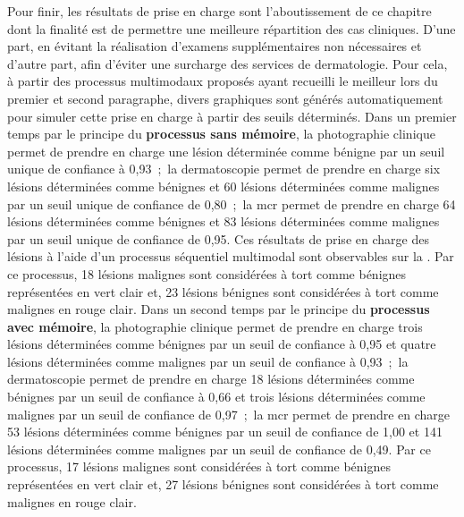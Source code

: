 Pour finir, les résultats de prise en charge sont l'aboutissement de ce chapitre dont la finalité est de permettre une meilleure répartition des cas cliniques. D'une part, en évitant la réalisation d'examens supplémentaires non nécessaires et d'autre part, afin d'éviter une surcharge des services de dermatologie. Pour cela, à partir des processus multimodaux proposés ayant recueilli le meilleur \fscore{} lors du premier et second paragraphe, divers graphiques sont générés automatiquement pour simuler cette prise en charge à partir des seuils déterminés. Dans un premier temps par le principe du \textbf{processus sans mémoire}, la photographie clinique permet de prendre en charge une lésion déterminée comme bénigne par un seuil unique de confiance à 0,93~;~la dermatoscopie permet de prendre en charge six lésions déterminées comme bénignes et 60 lésions déterminées comme malignes par un seuil unique de confiance de 0,80~;~la \gls{mcr} permet de prendre en charge 64 lésions déterminées comme bénignes et 83 lésions déterminées comme malignes par un seuil unique de confiance de 0,95. Ces résultats de prise en charge des lésions à l'aide d'un processus séquentiel multimodal sont observables sur la . Par ce processus, 18 lésions malignes sont considérées à tort comme bénignes représentées en vert clair et, 23 lésions bénignes sont considérées à tort comme malignes en rouge clair. Dans un second temps par le principe du \textbf{processus avec mémoire}, la photographie clinique permet de prendre en charge trois lésions déterminées comme bénignes par un seuil de confiance à 0,95 et quatre lésions déterminées comme malignes par un seuil de confiance à 0,93~;~la dermatoscopie permet de prendre en charge 18 lésions déterminées comme bénignes par un seuil de confiance à 0,66 et trois lésions déterminées comme malignes par un seuil de confiance de 0,97~;~la \gls{mcr} permet de prendre en charge 53 lésions déterminées comme bénignes par un seuil de confiance de 1,00 et 141 lésions déterminées comme malignes par un seuil de confiance de 0,49. Par ce processus, 17 lésions malignes sont considérées à tort comme bénignes représentées en vert clair et, 27 lésions bénignes sont considérées à tort comme malignes en rouge clair.\par

